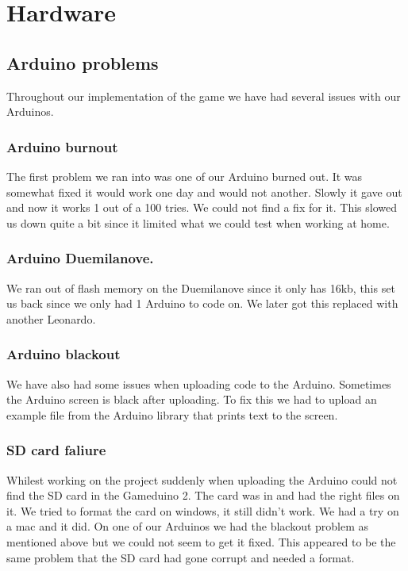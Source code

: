 \section{Hardware}

\subsection{Arduino problems}
Throughout our implementation of the game we have had several issues with our Arduinos.

\subsubsection{Arduino burnout}
The first problem we ran into was one of our Arduino burned out. It was somewhat fixed it would work one day and would not another. Slowly it gave out and now it works 1 out of a 100 tries. We could not find a fix for it. This slowed us down quite a bit since it limited what we could test when working at home.

\subsubsection{Arduino Duemilanove.}
We ran out of flash memory on the Duemilanove since it only has 16kb, this set us back since we only had 1 Arduino to code on. We later got this replaced with another Leonardo.

\subsubsection{Arduino blackout}
We have also had some issues when uploading code to the Arduino. Sometimes the Arduino screen is black after uploading. To fix this we had to upload an example file from the Arduino library that prints text to the screen.

\subsubsection{SD card faliure}
Whilest working on the project suddenly when uploading the Arduino could not find the SD card in the Gameduino 2. The card was in and had the right files on it. We tried to format the card on windows, it still didn't work. We had a try on a mac and it did. On one of our Arduinos we had the blackout problem as mentioned above but we could not seem to get it fixed. This appeared to be the same problem that the SD card had gone corrupt and needed a format.